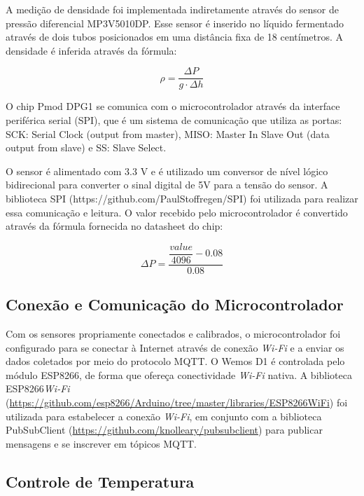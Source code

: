 A medição de densidade foi implementada indiretamente através do sensor de pressão diferencial MP3V5010DP. Esse sensor é inserido no líquido fermentado através de dois tubos posicionados em uma distância fixa de 18 centímetros. A densidade é inferida através da fórmula: 

\begin{equation}
    \rho = \dfrac{\Delta P}{g \cdot \Delta h}
\end{equation}

O chip Pmod DPG1 se comunica com o microcontrolador através da interface periférica serial (SPI), que é um sistema de comunicação que utiliza as portas: SCK: Serial Clock (output from master), MISO: Master In Slave Out (data output from slave) e SS: Slave Select.

O sensor é alimentado com 3.3 V e é utilizado um conversor de nível lógico bidirecional para converter o sinal digital de 5V para a tensão do sensor. A biblioteca SPI (https://github.com/PaulStoffregen/SPI) foi utilizada para realizar essa comunicação e leitura. O valor recebido pelo microcontrolador é convertido através da fórmula fornecida no datasheet do chip:

\begin{equation}
    \Delta P = \dfrac{\dfrac{value}{4096} - 0.08}{0.08} 
\end{equation}

\subsection{Conexão e Comunicação do Microcontrolador}

Com os sensores propriamente conectados e calibrados, o microcontrolador foi configurado para se conectar à Internet através de conexão \textit{Wi-Fi} e a enviar os dados coletados por meio do protocolo MQTT. O Wemos D1 é controlada pelo módulo ESP8266, de forma que ofereça conectividade \textit{Wi-Fi} nativa. 
A biblioteca ESP8266\textit{Wi-Fi} (\url{https://github.com/esp8266/Arduino/tree/master/libraries/ESP8266WiFi}) foi utilizada para estabelecer a conexão \textit{Wi-Fi}, em conjunto com a biblioteca PubSubClient (\url{https://github.com/knolleary/pubsubclient}) para publicar mensagens e se inscrever em tópicos MQTT. 




\subsection{Controle de Temperatura}

